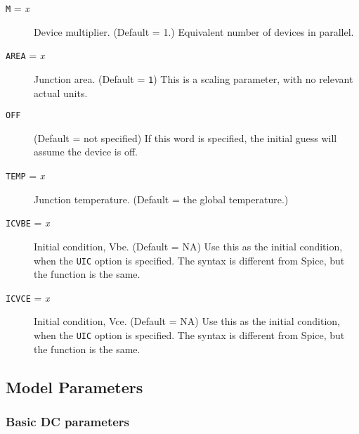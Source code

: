 \begin{description}

\item[{\tt M} = {\it x}]
Device multiplier.  (Default = 1.)  Equivalent number of devices in parallel.

\item[{\tt AREA} = {\it x}]
Junction area.  (Default = {\tt 1}) This is a scaling parameter, with
no relevant actual units.

\item[{\tt OFF}] 
(Default = not specified) If this word is specified, the initial guess
will assume the device is off.

\item[{\tt TEMP} = {\it x}]
Junction temperature. (Default = the global temperature.)

\item[{\tt ICVBE} = {\it x}]
Initial condition, Vbe.  (Default = NA) Use this as the initial
condition, when the {\tt UIC} option is specified.  The syntax is
different from Spice, but the function is the same.

\item[{\tt ICVCE} = {\it x}]
Initial condition, Vce.  (Default = NA) Use this as the initial
condition, when the {\tt UIC} option is specified.  The syntax is
different from Spice, but the function is the same.

\end{description}
\subsection{Model Parameters}

\subsubsection{Basic DC parameters}

